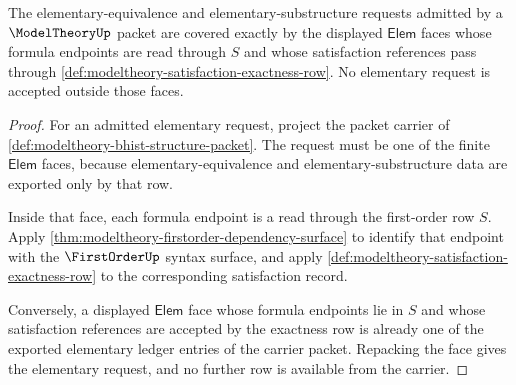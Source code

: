 \begin{theorem}\label{thm:modeltheory-elementary-ledger-coverage}
The elementary-equivalence and elementary-substructure requests admitted by a
$\ModelTheoryUp$ packet are covered exactly by the displayed $\mathsf{Elem}$
faces whose formula endpoints are read through $S$ and whose satisfaction
references pass through \autoref{def:modeltheory-satisfaction-exactness-row}.
No elementary request is accepted outside those faces.
\end{theorem}
\begin{proof}
For an admitted elementary request, project the packet carrier of
\autoref{def:modeltheory-bhist-structure-packet}. The request must be one of
the finite $\mathsf{Elem}$ faces, because elementary-equivalence and
elementary-substructure data are exported only by that row.

Inside that face, each formula endpoint is a read through the first-order row
$S$. Apply \autoref{thm:modeltheory-firstorder-dependency-surface} to identify
that endpoint with the $\FirstOrderUp$ syntax surface, and apply
\autoref{def:modeltheory-satisfaction-exactness-row} to the corresponding
satisfaction record.

Conversely, a displayed $\mathsf{Elem}$ face whose formula endpoints lie in
$S$ and whose satisfaction references are accepted by the exactness row is
already one of the exported elementary ledger entries of the carrier packet.
Repacking the face gives the elementary request, and no further row is
available from the carrier.
\end{proof}

